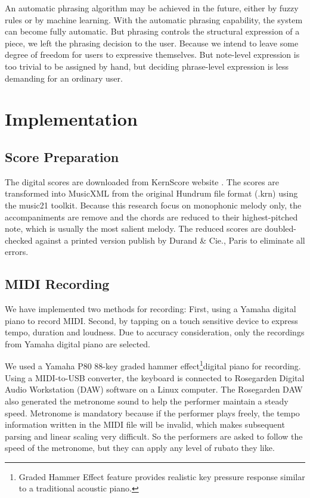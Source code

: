    An automatic phrasing algorithm may be achieved in the future, either by fuzzy rules or by machine learning. With the automatic phrasing capability, the system can become fully automatic. But phrasing controls the structural expression of a piece, we left the phrasing decision to the user. Because we intend to leave some degree of freedom for users to expressive themselves. But note-level expression is too trivial to be assigned by hand, but deciding phrase-level expression is less demanding for an ordinary user. 

 
\section{Implementation}

\subsection{Score Preparation}

The digital scores are downloaded from KernScore website \cite{KernScores}. The  scores are transformed into MusicXML from the original Hundrum file format (.krn) using the  music21 toolkit\cite{music21}. Because this research focus on monophonic melody only, the accompaniments are remove and the chords are reduced to their highest-pitched note, which is usually the most salient melody. The reduced scores are doubled-checked against a printed version publish by Durand \& Cie., Paris \cite{Clementi1915} to eliminate all errors. %

\subsection{MIDI Recording}
We have implemented two methods for recording: First, using a Yamaha digital piano to record MIDI. Second, by tapping on a touch sensitive device to express tempo, duration and loudness. Due to accuracy consideration, only the recordings from Yamaha digital piano are selected.


We used a Yamaha P80 88-key graded hammer effect\footnote{Graded Hammer Effect feature provides realistic key pressure response similar to a traditional acoustic piano.}digital piano for recording. Using a MIDI-to-USB converter, the keyboard is connected to Rosegarden Digital Audio Workstation (DAW) software on a Linux computer. The Rosegarden DAW also generated the metronome sound to help the performer maintain a steady speed. Metronome is mandatory because if the performer plays freely, the tempo information written in the MIDI file will be invalid, which makes subsequent parsing and linear scaling very difficult. So the performers are asked to follow the speed of the metronome, but they can apply any level of rubato they like. 

